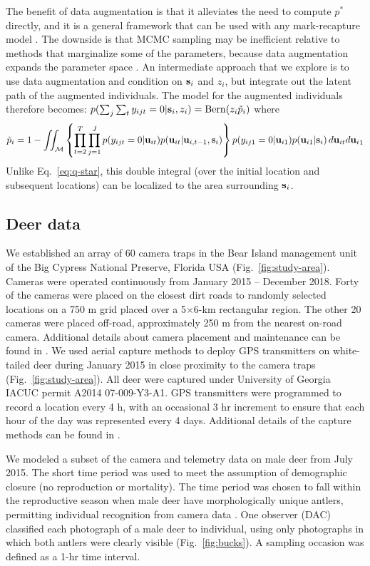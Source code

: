 \documentclass[12pt]{article}
\newcommand{\bsi}{{\bf s}_i}
\newcommand{\bu}{{\bf u}}
\newcommand{\bui}{{\bf u}_i}
\newcommand{\buit}{{\bf u}_{it}}
\begin{document}
The benefit of data augmentation is that it alleviates
the need to compute $p^*$ directly,
and it is a general framework that can be used with any mark-recapture
model \citep{royle_dorazio:2008}. The downside is that MCMC sampling
may be inefficient relative to methods that marginalize some of the
parameters, because data augmentation expands the parameter
space \citep{king_etal:2016}. An intermediate approach that we explore
is to use data augmentation and condition on ${\bsi}$ and $z_i$, but
integrate out the latent path of the augmented individuals. The model
for the augmented individuals therefore becomes:
$p(\sum_j \sum_t y_{ijt}=0|\bsi,z_i) = \mathrm{Bern}(z_i \tilde{p}_i)$ where
\begin{equation}
  \tilde{p}_i = 1-\iint_{\mathcal{M}} \left\{\prod_{t=2}^T \prod_{j=1}^J p(y_{ijt}=0|\buit)p(\buit|\bu_{i,t-1},\bsi)\right\}p(y_{ij1}=0|\bu_{i1})p(\bu_{i1}|\bsi) \, d\buit d{\bui}_1
\label{eq:p-tilde}
\end{equation}
Unlike Eq.~\ref{eq:q-star}, this double integral (over the initial
location and subsequent locations) can be localized to the area
surrounding $\bsi$. 


\subsection{Deer data}

We established an array of 60 camera traps in the Bear Island
management unit of the Big Cypress National Preserve, Florida USA
(Fig.~\ref{fig:study-area}). Cameras were operated continuously from
January 2015 -- December 2018. Forty of the cameras were placed
on the closest dirt roads to randomly selected locations on a 750 m
grid placed over a 5$\times$6-km rectangular region.
The other 20 cameras were placed off-road, approximately 250 m from
the nearest on-road camera. Additional details about camera placement and
maintenance can be found in \citet{chandler_etal:2018mee}.
We used aerial capture methods to deploy GPS transmitters on 
white-tailed deer during January 2015 in close proximity to the camera
traps (Fig.~\ref{fig:study-area}). All deer were
captured under University of Georgia IACUC permit A2014
07-009-Y3-A1. GPS transmitters were programmed to record a location
every 4 h, with an occasional 3 hr increment to ensure that each hour
of the day was represented every 4 days. Additional details of the
capture methods can be found in \citet{cherry_etal:2018}.

We modeled a subset of the camera and telemetry data on male deer
from July 2015. The short time period was used to meet the
assumption of demographic closure (no reproduction or mortality). The
time period was chosen to fall within the reproductive season when male deer have
morphologically unique antlers, permitting individual recognition from
camera data \citep{beaver_etal:2016}. One observer (DAC) classified each
photograph of a male deer to individual, using only photographs in
which both antlers were clearly visible (Fig.~\ref{fig:bucks}).
A sampling occasion was defined as a 1-hr time interval.
\end{document}

